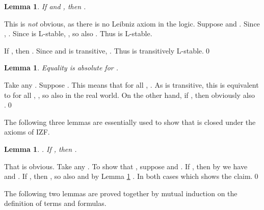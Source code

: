 \documentclass{LMCS}
\newtheorem{lemma}[thm]{Lemma}
\newcommand{\izfr}{IZF}
\begin{document}
\begin{lemma}\label{t1}
If  and , then . 
\end{lemma}
\proof This is \emph{not} obvious, as there is no Leibniz axiom in the logic. 
Suppose  and . Since , . Since  is L-stable, , so also . Thus  is L-stable. 

If , then . Since  and  is transitive, . Thus  is transitively L-stable.\qed


\begin{lemma}
Equality is absolute for .
\end{lemma}
\proof Take any . Suppose . This means that for all ,
. As  is transitive, this is equivalent to for all
, , so also  in the real world. On the
other hand, if , then obviously also
.\qed


The following three lemmas are essentially used to show that  is closed
under the axioms of \izfr. 

\begin{lemma}\label{omegat}
. If , then . 
\end{lemma}
\proof That  is obvious. Take any . To show that , suppose  and . If , then by  we have  and . If , then , so
also  and by Lemma \ref{t1} . In both cases  which shows the claim.\qed


The following two lemmas are proved together by mutual induction on the
definition of terms and formulas. 
\end{document}
